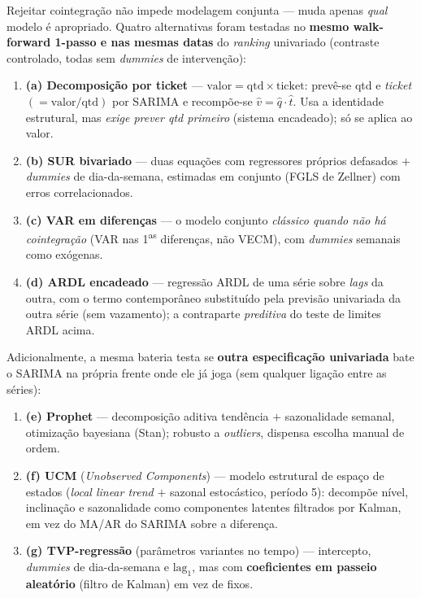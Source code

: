 \documentclass[11pt,a4paper]{article}
\begin{document}
Rejeitar cointegração não impede modelagem conjunta --- muda apenas \emph{qual} modelo é apropriado.
Quatro alternativas foram testadas no \textbf{mesmo walk-forward 1-passo e nas mesmas datas} do
\emph{ranking} univariado (contraste controlado, todas sem \emph{dummies} de intervenção):
\begin{enumerate}\setlength\itemsep{1pt}
\item \textbf{(a) Decomposição por ticket} --- $\text{valor}=\text{qtd}\times\text{ticket}$:
prevê-se qtd e \emph{ticket} $(=\text{valor}/\text{qtd})$ por SARIMA e recompõe-se $\hat v=\hat
q\cdot\hat t$. Usa a identidade estrutural, mas \emph{exige prever qtd primeiro} (sistema
encadeado); só se aplica ao valor.
\item \textbf{(b) SUR bivariado} --- duas equações com regressores próprios defasados $+$
\emph{dummies} de dia-da-semana, estimadas em conjunto (FGLS de Zellner) com erros correlacionados.
\item \textbf{(c) VAR em diferenças} --- o modelo conjunto \emph{clássico quando não há
cointegração} (VAR nas 1\textsuperscript{as} diferenças, não VECM), com \emph{dummies} semanais como
exógenas.
\item \textbf{(d) ARDL encadeado} --- regressão ARDL de uma série sobre \emph{lags} da outra, com o
termo contemporâneo substituído pela previsão univariada da outra série (sem vazamento); a
contraparte \emph{preditiva} do teste de limites ARDL acima.
\end{enumerate}

Adicionalmente, a mesma bateria testa se \textbf{outra especificação univariada} bate o SARIMA na
própria frente onde ele já joga (sem qualquer ligação entre as séries):
\begin{enumerate}\setlength\itemsep{1pt}\setcounter{enumi}{4}
\item \textbf{(e) Prophet} --- decomposição aditiva tendência $+$ sazonalidade semanal, otimização
bayesiana (Stan); robusto a \emph{outliers}, dispensa escolha manual de ordem.
\item \textbf{(f) UCM} (\emph{Unobserved Components}) --- modelo estrutural de espaço de estados
(\emph{local linear trend} $+$ sazonal estocástico, período 5): decompõe nível, inclinação e
sazonalidade como componentes latentes filtrados por Kalman, em vez do MA/AR do SARIMA sobre a
diferença.
\item \textbf{(g) TVP-regressão} (parâmetros variantes no tempo) --- intercepto, \emph{dummies} de
dia-da-semana e $\text{lag}_1$, mas com \textbf{coeficientes em passeio aleatório} (filtro de
Kalman) em vez de fixos.
\end{enumerate}
\end{document}
